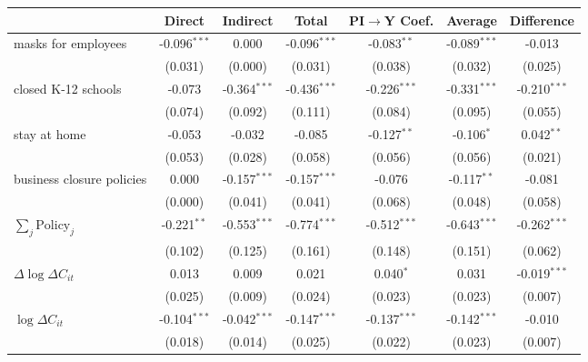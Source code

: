 
\begin{tabular}{lccccc|>{}c}
\toprule
  & Direct & Indirect & Total & PI$\to$Y Coef. & Average & Difference\\
\midrule
masks for employees & -0.096$^{***}$ & 0.000 & -0.096$^{***}$ & -0.083$^{**}$ & -0.089$^{***}$ & -0.013\\
 & (0.031) & (0.000) & (0.031) & (0.038) & (0.032) & (0.025)\\
closed K-12 schools & -0.073 & -0.364$^{***}$ & -0.436$^{***}$ & -0.226$^{***}$ & -0.331$^{***}$ & -0.210$^{***}$\\
 & (0.074) & (0.092) & (0.111) & (0.084) & (0.095) & (0.055)\\
stay at home & -0.053 & -0.032 & -0.085 & -0.127$^{**}$ & -0.106$^{*}$ & 0.042$^{**}$\\
 & (0.053) & (0.028) & (0.058) & (0.056) & (0.056) & (0.021)\\
business closure policies & 0.000 & -0.157$^{***}$ & -0.157$^{***}$ & -0.076 & -0.117$^{**}$ & -0.081\\
 & (0.000) & (0.041) & (0.041) & (0.068) & (0.048) & (0.058)\\
$\sum_j \mathrm{Policy}_j$ & -0.221$^{**}$ & -0.553$^{***}$ & -0.774$^{***}$ & -0.512$^{***}$ & -0.643$^{***}$ & -0.262$^{***}$\\
 & (0.102) & (0.125) & (0.161) & (0.148) & (0.151) & (0.062)\\
$\Delta \log \Delta C_{it}$ & 0.013 & 0.009 & 0.021 & 0.040$^{*}$ & 0.031 & -0.019$^{***}$\\
 & (0.025) & (0.009) & (0.024) & (0.023) & (0.023) & (0.007)\\
$\log \Delta C_{it}$ & -0.104$^{***}$ & -0.042$^{***}$ & -0.147$^{***}$ & -0.137$^{***}$ & -0.142$^{***}$ & -0.010\\
 & (0.018) & (0.014) & (0.025) & (0.022) & (0.023) & (0.007)\\
\bottomrule
\end{tabular}
